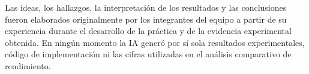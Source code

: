\documentclass[11pt,a4paper]{article}
\begin{document}
    Las ideas, los hallazgos, la interpretación de los resultados y las conclusiones fueron
    elaborados originalmente por los integrantes del equipo a partir de su experiencia durante
    el desarrollo de la práctica y de la evidencia experimental obtenida. En ningún momento la
    IA generó por sí sola resultados experimentales, código de implementación ni las cifras
    utilizadas en el análisis comparativo de rendimiento.

    
\end{document}
